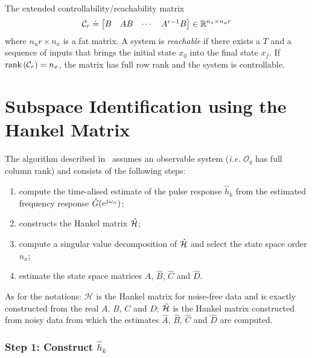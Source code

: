The extended controllability/reachability matrix
\begin{equation*}
  \mathcal{C}_r \doteq
  \begin{bmatrix}
    B & AB & \cdots & A^{r-1}B
  \end{bmatrix} \in \mathbb{R}^{n_x \times n_ur}
\end{equation*}
where $n_ur\times n_x$ is a fat matrix. A system is \emph{reachable} if there exists a $T$ and a sequence of inputs that brings the initial state $x_0$ into the final state $x_f$. If $\textrm{rank}\left(\mathcal{C}_r\right)=n_x$, the matrix has full row rank and the system is controllable.

\section{Subspace Identification using the Hankel Matrix}
\label{sec:subspaces-hankel}

The algorithm described in~\cite{mckelvey} assumes an observable system (\textit{i.e.} $\mathcal{O}_q$ has full column rank) and consists of the following steps:
\begin{enumerate}
\item compute the time-alised estimate of the pulse response $\hat{h}_k$ from the estimated frequency response $\hat{G}(e^{j\omega_n})$;
\item constructs the Hankel matrix $\hat{\mathcal{H}}$;
\item compute a singular value decomposition of $\hat{\mathcal{H}}$ and select the state space order $\hat{n}_x$;
\item estimate the state space matrices $\hat{A}$, $\hat{B}$, $\hat{C}$ and $\hat{D}$.
\end{enumerate}
As for the notations: $\mathcal{H}$ is the Hankel matrix for noise-free data and is exactly constructed from the real $A$, $B$, $C$ and $D$; $\hat{\mathcal{H}}$ is the Hankel matrix constructed from noisy data from which the estimates $\hat{A}$, $\hat{B}$, $\hat{C}$ and $\hat{D}$ are computed.

\subsubsection{Step 1: Construct $\hat{h}_k$}

